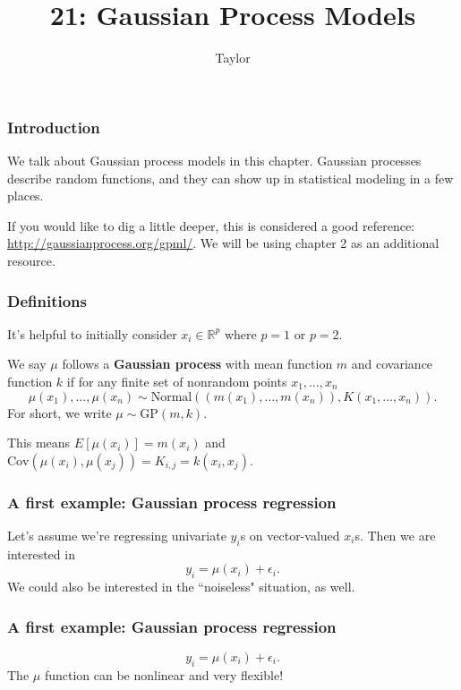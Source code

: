 \documentclass{beamer}
\title["21"]{21: Gaussian Process Models}
\author{Taylor}
\institute[UVA] 
{
University of Virginia \\
\medskip
\textit{} 
}
\date{}
\begin{document}

\begin{frame}
\titlepage 
\end{frame}

\begin{frame}
\frametitle{Introduction}

We talk about Gaussian process models in this chapter. Gaussian processes describe random functions, and they can show up in statistical modeling in a few places. 
\newline

If you would like to dig a little deeper, this is considered a good reference: \url{http://gaussianprocess.org/gpml/}. We will be using chapter 2 as an additional resource.

\end{frame}
\begin{frame}
\frametitle{Definitions}

It's helpful to initially consider $x_i \in \mathbb{R}^p$ where $p=1$ or $p=2$.
\newline

We say $\mu$ follows a {\bf Gaussian process} with mean function $m$ and covariance function $k$ if for any finite set of nonrandom points $x_1, \ldots, x_n$
$$
\mu(x_1), \ldots, \mu(x_n) \sim \text{Normal}( (m(x_1), \ldots, m(x_n)), K(x_1, \ldots, x_n)).
$$
For short, we write $\mu \sim \text{GP}(m,k)$. 
\pause
\newline

This means $E[\mu(x_i)] = m(x_i)$ and $\text{Cov}(\mu(x_i), \mu(x_j)) = K_{i,j} = k(x_i,x_j)$.
\newline


\end{frame}

\begin{frame}
\frametitle{A first example: Gaussian process regression}

Let's assume we're regressing univariate $y_i$s on vector-valued $x_i$s. Then we are interested in 
$$
y_i = \mu(x_i) + \epsilon_i.
$$
We could also be interested in the ``noiseless" situation, as well. 



\end{frame}
\begin{frame}
\frametitle{A first example: Gaussian process regression}

$$
y_i = \mu(x_i) + \epsilon_i.
$$
The $\mu$ function can be nonlinear and very flexible!
\newline


\end{frame}
\end{document}
